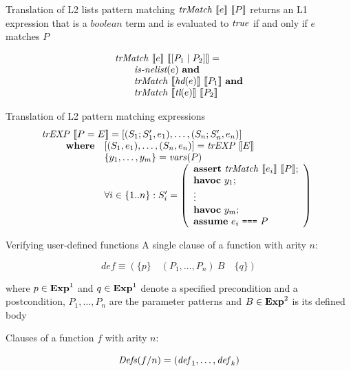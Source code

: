 \documentclass{beamer}
\begin{document}
  \begin{frame}{Translation of L2 lists pattern matching}
    $\mathit{trMatch}~\llbracket e\rrbracket~\llbracket P\rrbracket$ returns an L1 expression that is a $\mathit{boolean}$ 
    term and is evaluated to $\mathit{true}$ if and only if $e$ matches $P$

    \pause 

    \[
      \begin{array}{l}
        \mathit{trMatch}~\llbracket e\rrbracket~\llbracket[P_1\mid P_2]\rrbracket = \\
        \qquad\textit{is-nelist}(e)~\mathbf{and}\\
        \qquad\mathit{trMatch}~\llbracket\textit{hd}(e)\rrbracket~\llbracket P_1\rrbracket~\mathbf{and}\\
        \qquad\mathit{trMatch}~\llbracket\textit{tl}(e)\rrbracket~\llbracket P_2\rrbracket
      \end{array}
    \]
  \end{frame}
  \begin{frame}{Translation of L2 pattern matching expressions}
    \[
      \begin{array}{l}
      \mathit{trEXP}~\llbracket P = E\rrbracket = [(S_1;S_1',e_1), \dots, (S_n;S_n', e_n)] \\
      \qquad 
      \begin{array}{ll}
      \textbf{where} & [(S_1,e_1),\dots,(S_n, e_n)] = \mathit{trEXP}~\llbracket E\rrbracket \\
      & \{y_1, \ldots, y_m\} = \mathit{vars}(P) \\
      & \forall i \in \{1..n\}: S_i' = \left(
      \begin{array}{l}
      \textbf{assert}~\mathit{trMatch}~\llbracket e_i\rrbracket~\llbracket P\rrbracket;\\
      \textbf{havoc}~y_1;\\
      \vdots\\
      \textbf{havoc}~y_m;\\
      \textbf{assume}~e_i ~\texttt{===}~ P\\
      \end{array}
      \right)
      \end{array}
      \end{array}
    \]
  \end{frame}
  \begin{frame}{Verifying user-defined functions}
    A single clause of a function with arity $n$:

    \[
    \mathit{def} \equiv \left(\{ p \}  \quad (P_1, \dots, P_n)~B \quad \{ q \} \right)
    \]

    \pause where $p \in \mathbf{Exp}^{1}$ and $q \in \mathbf{Exp}^{1}$ denote a specified precondition and a
    postcondition, $P_1, \dots, P_n$ are the parameter patterns and $B \in \mathbf{Exp}^{2}$
    is its defined body

    \pause \medskip

    Clauses of a function $f$ with arity $n$:

    \[
      \mathit{Defs}(f/n) = (\mathit{def}_1,\dots,\mathit{def}_k)
    \]
  \end{frame}
\end{document}
